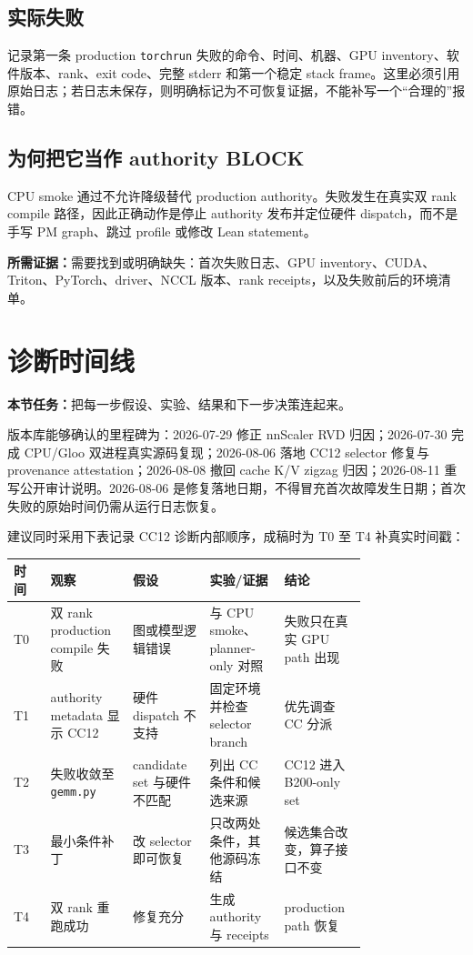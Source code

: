 \documentclass[11pt,a4paper]{ctexart}
\newcommand{\contract}[1]{\par\smallskip\noindent\colorbox{light}{\parbox{0.95\linewidth}{\textbf{本节任务：}#1}}\par\smallskip}
\newcommand{\evidence}[1]{\par\noindent\textbf{所需证据：}#1\par}
\begin{document}
\subsection{实际失败}
记录第一条 production \texttt{torchrun} 失败的命令、时间、机器、GPU inventory、软件版本、rank、exit code、完整 stderr 和第一个稳定 stack frame。这里必须引用原始日志；若日志未保存，则明确标记为不可恢复证据，不能补写一个“合理的”报错。

\subsection{为何把它当作 authority BLOCK}
CPU smoke 通过不允许降级替代 production authority。失败发生在真实双 rank compile 路径，因此正确动作是停止 authority 发布并定位硬件 dispatch，而不是手写 PM graph、跳过 profile 或修改 Lean statement。

\evidence{需要找到或明确缺失：首次失败日志、GPU inventory、CUDA、Triton、PyTorch、driver、NCCL 版本、rank receipts，以及失败前后的环境清单。}

\section{诊断时间线}
\contract{把每一步假设、实验、结果和下一步决策连起来。}

版本库能够确认的里程碑为：2026-07-29 修正 nnScaler RVD 归因；2026-07-30 完成 CPU/Gloo 双进程真实源码复现；2026-08-06 落地 CC12 selector 修复与 provenance attestation；2026-08-08 撤回 cache K/V zigzag 归因；2026-08-11 重写公开审计说明。2026-08-06 是修复落地日期，不得冒充首次故障发生日期；首次失败的原始时间仍需从运行日志恢复。

建议同时采用下表记录 CC12 诊断内部顺序，成稿时为 T0 至 T4 补真实时间戳：
\begin{longtable}{p{0.09\linewidth}p{0.16\linewidth}p{0.18\linewidth}p{0.18\linewidth}p{0.16\linewidth}}
\toprule
时间 & 观察 & 假设 & 实验/证据 & 结论 \\
\midrule
T0 & 双 rank production compile 失败 & 图或模型逻辑错误 & 与 CPU smoke、planner-only 对照 & 失败只在真实 GPU path 出现 \\
T1 & authority metadata 显示 CC12 & 硬件 dispatch 不支持 & 固定环境并检查 selector branch & 优先调查 CC 分派 \\
T2 & 失败收敛至 \texttt{gemm.py} & candidate set 与硬件不匹配 & 列出 CC 条件和候选来源 & CC12 进入 B200-only set \\
T3 & 最小条件补丁 & 改 selector 即可恢复 & 只改两处条件，其他源码冻结 & 候选集合改变，算子接口不变 \\
T4 & 双 rank 重跑成功 & 修复充分 & 生成 authority 与 receipts & production path 恢复 \\
\bottomrule
\end{longtable}
\end{document}
